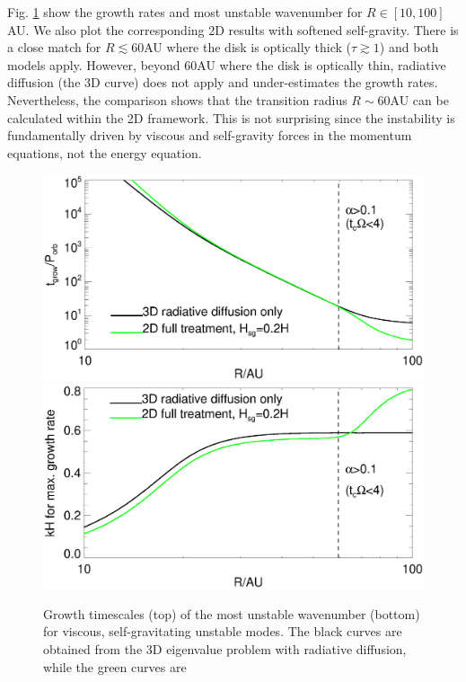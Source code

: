 Fig. \ref{rafikov_growth3d} show the growth rates and most unstable
wavenumber for $R\in[10,100]$AU. We also plot the corresponding 2D
results with softened self-gravity. There is a close match for
$R\lesssim60$AU where the disk is optically thick ($\tau\gtrsim
1$) and both models apply. However, beyond $60$AU where the disk is
optically thin, radiative diffusion (the 3D curve) does not apply and
under-estimates the growth rates. Nevertheless, the comparison shows
that the transition radius $R\sim60$AU can be calculated within the 2D
framework. This is not surprising since the instability is 
fundamentally driven by viscous and self-gravity forces in the
momentum equations, not the energy equation. 


\begin{figure}
  \includegraphics[width=\linewidth,clip=true,trim=0cm 1.5cm 0cm
    0.0cm]{figures/ppd_3d_rates}\\
  \includegraphics[width=\linewidth,clip=true,trim=0cm 0cm 0cm
    0.8cm]{figures/ppd_3d_maxk}
  \caption{Growth timescales (top) of the most unstable
    wavenumber (bottom) for viscous, 
    self-gravitating unstable modes. The black curves are obtained
    from the 3D eigenvalue problem with radiative diffusion, while the
    green curves are 
    \label{rafikov_growth3d}}
\end{figure}






